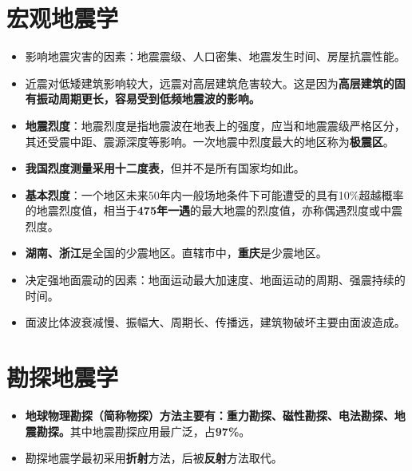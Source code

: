 \documentclass[twoside,titlepage,hyperref,UTF8,12pt]{ctexart}
\begin{document}
\section{宏观地震学}
\begin{itemize}
    \item 影响地震灾害的因素：地震震级、人口密集、地震发生时间、房屋抗震性能。
    \item 近震对低矮建筑影响较大，远震对高层建筑危害较大。这是因为\textbf{高层建筑的固有振动周期更长，容易受到低频地震波的影响。}
    \item \textbf{地震烈度}：地震烈度是指地震波在地表上的强度，应当和地震震级严格区分，其还受震中距、震源深度等影响。一次地震中烈度最大的地区称为\textbf{极震区}。
    \item \textbf{我国烈度测量采用十二度表}，但并不是所有国家均如此。
    \item \textbf{基本烈度}：一个地区未来50年内一般场地条件下可能遭受的具有10\%超越概率的地震烈度值，相当于\textbf{475年一遇}的最大地震的烈度值，亦称偶遇烈度或中震烈度。
    \item \textbf{湖南、浙江}是全国的少震地区。直辖市中，\textbf{重庆}是少震地区。
    \item 决定强地面震动的因素：地面运动最大加速度、地面运动的周期、强震持续的时间。
    \item 面波比体波衰减慢、振幅大、周期长、传播远，建筑物破坏主要由面波造成。
\end{itemize}

\section{勘探地震学}
\begin{itemize}
    \item \textbf{地球物理勘探（简称物探）方法主要有：重力勘探、磁性勘探、电法勘探、地震勘探。}其中地震勘探应用最广泛，占\textbf{97\%}。
    \item 勘探地震学最初采用\textbf{折射}方法，后被\textbf{反射}方法取代。
\end{itemize}
\end{document}
